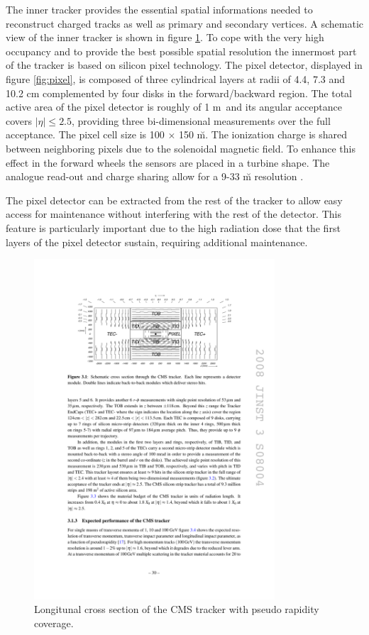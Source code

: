 The inner tracker provides the essential spatial informations needed to reconstruct charged tracks as well as primary and secondary vertices. A schematic view of the inner tracker is shown in figure \ref{fig:tracker}. To cope with the very high occupancy and to provide the best possible spatial resolution the innermost part of the tracker is based on silicon pixel technology. The pixel detector, displayed in figure \ref{fig:pixel}, is composed of three cylindrical layers at radii of 4.4, 7.3 and 10.2 cm complemented by four disks  in the forward/backward region. The total active area of the pixel detector is roughly of 1 m\sq~and its angular acceptance covers $|\eta| \leq 2.5$, providing three bi-dimensional measurements over the full acceptance. The pixel cell size is 100 $\times$ 150 \u m\sq. The ionization charge is shared between neighboring pixels due to the solenoidal magnetic field. To enhance this effect in the forward wheels the sensors are placed in a turbine shape. The analogue read-out and charge sharing allow for a 9-33 \u m resolution \cite{trackingpaper}. 

The pixel detector can be extracted from the rest of the tracker to allow easy access for maintenance without interfering with the rest of the detector. This feature is particularly important due to the high radiation dose that the first layers of the pixel detector sustain, requiring additional maintenance.

\begin{figure}
\begin{center}
\includegraphics[angle=-0,width=0.8\textwidth]{2_LHC_and_CMS/pics/trkxsec.pdf}
\caption{Longitunal cross section of the CMS tracker with pseudo rapidity coverage. 
\label{fig:tracker}
}
\end{center}
\end{figure}

